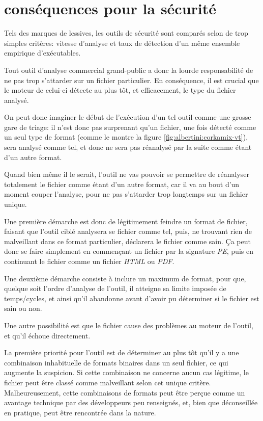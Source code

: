 \section{conséquences pour la sécurité}
Tels des marques de lessives, les outils de sécurité sont comparés selon de trop simples critères: vitesse d'analyse et taux de détection d'un même ensemble empirique d'exécutables.

Tout outil d'analyse commercial grand-public a donc la lourde responsabilité de ne pas trop s'attarder sur un fichier particulier. En conséquence, il est crucial que le moteur de celui-ci détecte au plus tôt, et efficacement, le type du fichier analysé.

On peut donc imaginer le début de l'exécution d'un tel outil comme une grosse gare de triage: il n'est donc pas surprenant qu'un fichier, une fois détecté comme un seul type de format (comme le montre la figure \ref{fig:albertini:corkamix-vt}), sera analysé comme tel, et donc ne sera pas réanalysé par la suite comme étant d'un autre format.

Quand bien même il le serait, l'outil ne vas pouvoir se permettre de réanalyser totalement le fichier comme étant d'un autre format, car il va au bout d'un moment couper l'analyse, pour ne pas s'attarder trop longtemps sur un fichier unique.

Une première démarche est donc de légitimement feindre un format de fichier, faisant que l'outil ciblé analysera se fichier comme tel, puis, ne trouvant rien de malveillant dans ce format particulier, déclarera le fichier comme sain.
Ça peut donc se faire simplement en commençant un fichier par la signature {\em PE},
puis en continuant le fichier comme un fichier {\em HTML} ou {\em PDF}.

Une deuxième démarche consiste à inclure un maximum de format, pour que, quelque soit l'ordre d'analyse de l'outil, il atteigne sa limite imposée de temps/cycles, et ainsi qu'il abandonne avant d'avoir pu déterminer si le fichier est sain ou non.

Une autre possibilité est que le fichier cause des problèmes au moteur de l'outil, et qu'il échoue directement.

La première priorité pour l'outil est de déterminer au plus tôt qu'il y a une combinaison inhabituelle de formats binaires dans un seul fichier, ce qui augmente la suspicion. Si cette combinaison ne concerne aucun cas légitime, le fichier peut être classé comme malveillant selon cet unique critère. Malheureusement, cette combinaisons de formats peut être perçue comme un avantage technique par des développeurs peu renseignés, et, bien que déconseillée en pratique, peut être rencontrée dans la nature.


